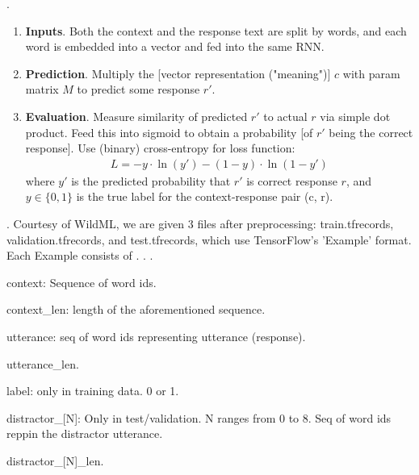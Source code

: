 \documentclass[11pt]{article}
\begin{document}
\myspace
\p {}. 


\begin{enumerate}
	\item \textbf{Inputs}. Both the context and the response text are split by words, and each word is embedded into a vector and fed into the same RNN.
	\item \textbf{Prediction}. Multiply the [vector representation ("meaning")] $c$ with param matrix $M$ to predict some response $r'$.
	\item \textbf{Evaluation}. Measure similarity of predicted $r'$ to actual $r$ via simple dot product. Feed this into sigmoid to obtain a probability [of $r'$ being the correct response]. Use (binary) cross-entropy for loss function:
	\begin{align}
	L = -y \cdot \ln(y') - (1 - y) \cdot \ln(1 - y')
	\end{align}
	where $y'$ is the predicted probability that $r'$ is correct response $r$, and $y \in \{0, 1\}$ is the true label for the context-response pair (c, r). 
\end{enumerate}



\myspace
\p {}. Courtesy of WildML, we are given 3 files after preprocessing: train.tfrecords, validation.tfrecords, and test.tfrecords, which use TensorFlow's 'Example' format. Each Example consists of . . . 
\begin{compactitem}
	\item context: Sequence of word ids. 
	\item context\_len: length of the aforementioned sequence.
	\item utterance: seq of word ids representing utterance (response). 
	\item utterance\_len.
	\item label: only in training data. 0 or 1.
	\item distractor\_[N]: Only in test/validation. N ranges from 0 to 8. Seq of word ids reppin the distractor utterance.
	\item distractor\_[N]\_len. 
\end{compactitem}








\end{document}
